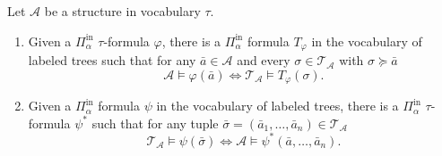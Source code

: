 \documentclass[10pt,a4paper]{amsart}
\providecommand{\tightlist}{%
  \setlength{\itemsep}{0pt}\setlength{\parskip}{0pt}}
\renewcommand{\phi}{\varphi}
\providecommand{\A}{\mathcal{A}}
\providecommand{\Pinf}[1]{\Pi^{\mathrm{in}}_{#1}}
\providecommand{\ba}{\bar a}
\newcommand{\T}{{\mathcal{T}}}
\begin{document}
\begin{lemma}\label{lemma:translation} 
   Let $\A$ be a structure in vocabulary $\tau$.
   \begin{enumerate}
      \tightlist
      \item\label{eq:pushforward} Given a $\Pinf{\alpha}$ $\tau$-formula $\phi$, there is a
         $\Pinf{\alpha}$ formula $T_\phi$ in the vocabulary of labeled trees
         such that for any $\ba\in \A$ and every $\sigma\in \T_\A$ with
         $\sigma\succeq \ba$ 
         \[\A\models\phi(\ba)\iff \T_\A\models T_\phi(\sigma).\]
      \item\label{eq:pullback} Given a $\Pinf{\alpha}$ formula $\psi$ in the
         vocabulary of labeled trees, there is a $\Pinf{\alpha}$ $\tau$-formula
         $\psi^*$ such that for any tuple $\bar{\sigma}=(\ba_1,\dots,\ba_n)\in
         \T_\A$ \[\T_\A\models \psi(\bar\sigma) \iff
         \A\models\psi^*(\ba,\dots,\ba_n).\]
      \end{enumerate}
\end{lemma} 
\end{document}
